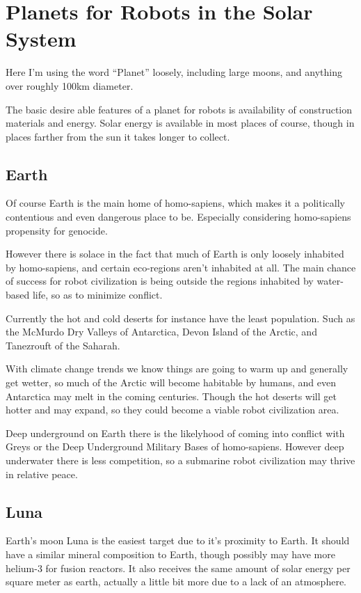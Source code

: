 \chapter{Planets for Robots in the Solar System}\label{robotPlanets}


Here I'm using the word ``Planet'' loosely, including large moons, and anything
over roughly 100km diameter. 

The basic desire able features of a planet for robots is availability of
construction materials and energy. Solar energy is available in most places of 
course, though in places farther from the sun it takes longer to collect. 



\section{Earth}

Of course Earth is the main home of homo-sapiens, which makes it a politically
contentious and even dangerous place to be. Especially considering homo-sapiens
propensity for genocide.

However there is solace in the fact that much of Earth is only loosely inhabited
by homo-sapiens, and certain eco-regions aren't inhabited at all. The main
chance of success for robot civilization is being outside the regions inhabited
by water-based life, so as to minimize conflict. 

Currently the hot and cold deserts for instance have the least population. Such
as the McMurdo Dry Valleys of Antarctica,  Devon Island of the Arctic, and
Tanezrouft of the Saharah.  

With climate change trends we know things are going to warm up and generally get
wetter, so much of the Arctic will become habitable by humans, and even
Antarctica may melt in the coming centuries. Though the hot deserts will get
hotter and may expand, so they could become a viable robot civilization area. 

Deep underground on Earth there is the likelyhood of coming into conflict with 
Greys or the Deep Underground Military Bases of homo-sapiens.   However deep
underwater there is less competition, so a submarine robot civilization may
thrive in relative peace. 

\section{Luna}

Earth's moon Luna is the easiest target due to it's proximity to Earth. It
should have a similar mineral composition to Earth, though possibly may have
more helium-3 for fusion reactors. It also receives the same amount of solar 
energy per square meter as earth, actually a little bit more due to a lack of an
atmosphere. 

